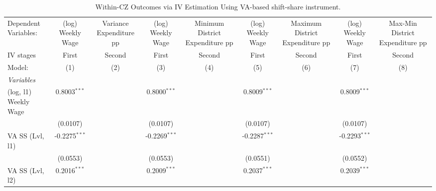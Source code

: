 \documentclass[
  10pt,
]{article}
\begin{document}
\begin{table}[htbp]
   \caption{\label{tbl_va_ss_baseline_within_cz} Within-CZ Outcomes via IV Estimation Using VA-based shift-share instrument.}
   \centering
   \begin{adjustbox}{max width=\linewidth}
      \begin{tabular}{lcccccccc}
         \tabularnewline \midrule \midrule
         Dependent Variables:                           & (log) Weekly Wage   & Variance Expenditure pp & (log) Weekly Wage   & Minimum District Expenditure pp & (log) Weekly Wage   & Maximum District Expenditure pp & (log) Weekly Wage   & Max-Min District Expenditure pp\\  
         IV stages                                      & First               & Second                  & First               & Second                          & First               & Second                          & First               & Second \\   
         Model:                                         & (1)                 & (2)                     & (3)                 & (4)                             & (5)                 & (6)                             & (7)                 & (8)\\  
         \midrule
         \emph{Variables}\\
         (log, l1) Weekly Wage                          & 0.8003$^{***}$      &                         & 0.8000$^{***}$      &                                 & 0.8009$^{***}$      &                                 & 0.8009$^{***}$      &   \\   
                                                        & (0.0107)            &                         & (0.0107)            &                                 & (0.0107)            &                                 & (0.0107)            &   \\   
         VA SS (Lvl, l1)                                & -0.2275$^{***}$     &                         & -0.2269$^{***}$     &                                 & -0.2287$^{***}$     &                                 & -0.2293$^{***}$     &   \\   
                                                        & (0.0553)            &                         & (0.0553)            &                                 & (0.0551)            &                                 & (0.0552)            &   \\   
         VA SS (Lvl, l2)                                & 0.2016$^{***}$      &                         & 0.2009$^{***}$      &                                 & 0.2037$^{***}$      &                                 & 0.2039$^{***}$      &   \\   

\end{tabular}
\end{adjustbox}
\end{table}
\end{document}
